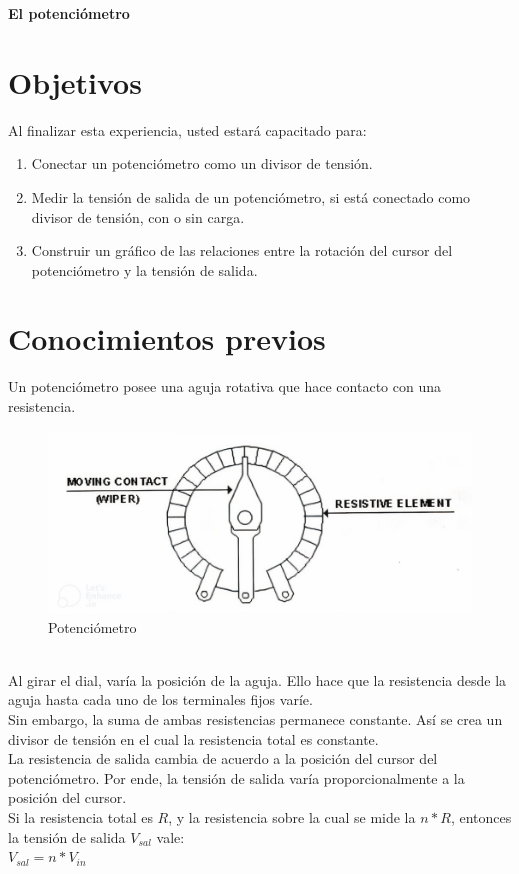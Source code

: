 \thispagestyle{fancy}
\begin{center}
	\LARGE{\textbf{El potenciómetro}}
\end{center}
\section{Objetivos}
Al finalizar esta experiencia, usted estará capacitado para:
\begin{enumerate}
	\item Conectar un potenciómetro como un divisor de tensión.
	\item Medir la tensión de salida de un potenciómetro, si está conectado como divisor de tensión, con o sin carga.
	\item Construir un gráfico de las relaciones entre la rotación del cursor del potenciómetro y la tensión de salida. 
\end{enumerate}
\section{Conocimientos previos}
Un potenciómetro posee una aguja rotativa que hace contacto con una resistencia.
\begin{figure}[h]
	\centering
	\includegraphics[scale=0.5]{imagenes/poten}
	\caption{Potenciómetro}
\end{figure}
\\
Al girar el dial, varía la posición de la aguja. Ello hace que la resistencia desde la aguja hasta cada uno de los terminales fijos varíe.
\\
Sin embargo, la suma de ambas resistencias permanece constante. Así se crea un divisor de tensión en el cual la resistencia total es constante.
\\
La resistencia de salida cambia de acuerdo a la posición del cursor del potenciómetro. Por ende, la tensión de salida varía proporcionalmente a la posición del cursor.
\\
Si la resistencia total es $R$, y la resistencia sobre la cual se mide la $n*R$, entonces la tensión de salida $V_{sal}$ vale:
\\ 
\textbf{\centering$V_{sal} = n*V_{in}$}
